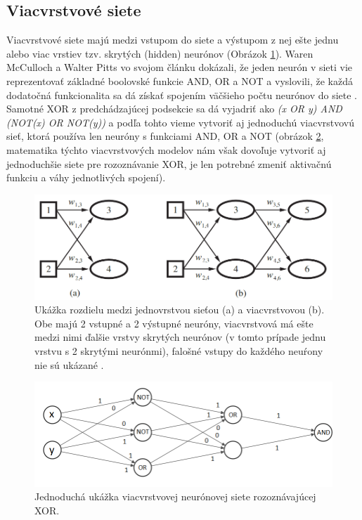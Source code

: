 \subsection{Viacvrstvové siete}
Viacvrstvové siete majú medzi vstupom do siete a výstupom z nej ešte jednu alebo viac vrstiev tzv. skrytých (hidden) neurónov (Obrázok \ref{img:single}).
Waren McCulloch a Walter Pitts vo svojom článku dokázali, že jeden neurón v sieti vie reprezentovať základné boolovské funkcie AND, OR a NOT a vyslovili, že každá dodatočná funkcionalita sa dá získať spojením väčšieho počtu neurónov do siete \citep{multi}. Samotné XOR z predchádzajúcej podsekcie sa dá vyjadriť ako 
\textit{(x OR y) AND (NOT(x) OR NOT(y))} a podľa tohto vieme vytvoriť aj jednoduchú viacvrstvovú sieť, ktorá používa len neuróny s funkciami AND, OR a NOT (obrázok \ref{img:xor}, matematika týchto viacvrstvových modelov nám však dovoľuje vytvoriť aj jednoduchšie siete pre rozoznávanie XOR, je len potrebné zmeniť aktivačnú funkciu a váhy jednotlivých spojení).

\begin{figure} \label{img:single}
\includegraphics[width=\textwidth]{../img/nn_aima_single_multi.png}
\caption{Ukážka rozdielu medzi jednovrstvou sieťou (a) a viacvrstvovou (b). Obe majú 2 vstupné a 2 výstupné neuróny, viacvrstvová má ešte medzi nimi ďalšie vrstvy skrytých neurónov (v tomto prípade jednu vrstvu s 2 skrytými neurónmi), falošné vstupy do každého neuŕony nie sú ukázané \citep{aima}.}
\end{figure}

\begin{figure} \label{img:xor}
\includegraphics[width=\textwidth]{../img/xor.png}
\caption{Jednoduchá ukážka viacvrstvovej neurónovej siete rozoznávajúcej XOR.}
\end{figure}


